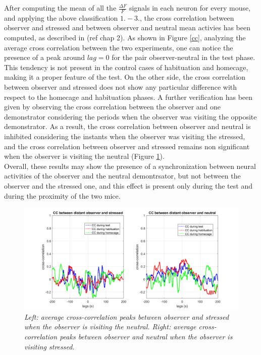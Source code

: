 \documentclass[12pt, a4paper]{article}
\begin{document}
After computing the mean of all the $\frac{\Delta F}{F}$ signals in each neuron for every mouse, and applying the above classification $1.-3.$, the cross correlation between observer and stressed and between observer and neutral mean activies has been computed, as described in (ref chap 2). As shown in Figure \ref*{cc}, analyzing the average cross correlation between the two experiments, one can notice the presence of a peak around $ lag=0 $ for the pair observer-neutral in the test phase. This tendency is not present in the control cases of habituation and homecage, making it a proper feature of the test. On the other side, the cross correlation between observer and stressed does not show any particular difference with respect to the homecage and habituation phases. A further verification has been given by observing the cross correlation between the observer and one demonstrator considering the periods when the observer was visiting the opposite demonstrator. As a result, the cross correlation between observer and neutral is inhibited considering the instants when the observer was visiting the stressed, and the cross correlation between observer and stressed remains non significant when the observer is visiting the neutral (Figure \ref{distant}).\\ Overall, these results may show the presence of a synchronization between neural activities of the observer and the neutral demontrsator, but not between the observer and the stressed one, and this effect is present only during the test and during the proximity of the two mice.

\begin{figure}[H]
	
	\begin{center}
		\hspace*{-1.4cm}
		\includegraphics[scale=.4]{cc_distant.png} 
	\end{center} 
	\caption{\textit{Left: average cross-correlation peaks between observer and stressed when the observer is visiting the neutral. Right: average cross-correlation peaks between observer and neutral when the observer is visiting stressed.}} \label{distant}
	
\end{figure}
\end{document}
